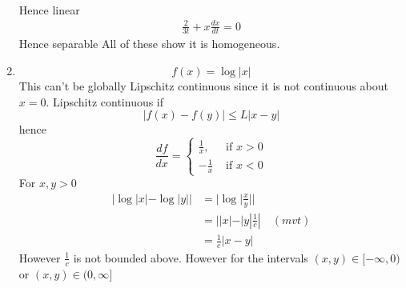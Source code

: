 \documentclass{/home/janmebows/Documents/LatexTemplates/myassignment}
\begin{document}
\begin{enumerate}
\begin{align*}
    \end{align*}
    Hence linear
    \begin{align*}
        \frac2{3t} + x\frac{dx}{dt} =0
    \end{align*}
    Hence separable
    All of these show it is homogeneous.
    \item 
    \[f(x) = \log |x|\]
    This can't be globally Lipschitz continuous since it is not continuous about $x=0$. 
    Lipschitz continuous if
    \[|f(x) - f(y)| \leq L |x-y|\]
    hence
    \[\frac{df}{dx} = \begin{cases}
        \frac1x, &\text{ if }x > 0\\
        -\frac1x & \text{ if } x<0
    \end{cases}\]
    For $x,y > 0$
    \begin{align*}
        |\log|x| - \log|y|| &= |\log|\frac{x}{y}||\\
        &=||x|-|y|\frac1c| \quad (mvt)\\
        &= \frac1c |x-y|
    \end{align*}
    However $\frac1c$ is not bounded above. However for the intervals $(x,y) \in [-\infty,0)$ or $(x,y) \in (0,\infty]$

\end{enumerate}
\end{document}
